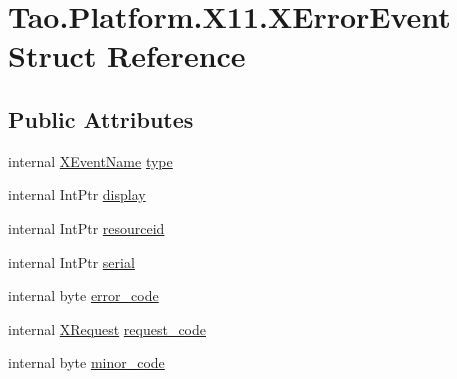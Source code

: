 \hypertarget{struct_tao_1_1_platform_1_1_x11_1_1_x_error_event}{
\section{Tao.Platform.X11.XErrorEvent Struct Reference}
\label{struct_tao_1_1_platform_1_1_x11_1_1_x_error_event}
}
\subsection*{Public Attributes}
\begin{DoxyCompactItemize}
\item 
internal \hyperlink{namespace_tao_1_1_platform_1_1_x11_aff81ed5b8778e1ea8e872861dff9f146}{XEventName} \hyperlink{struct_tao_1_1_platform_1_1_x11_1_1_x_error_event_a5a939be28f2545b3b519ab16ecab0cda}{type}
\item 
internal IntPtr \hyperlink{struct_tao_1_1_platform_1_1_x11_1_1_x_error_event_a1c2349bff48f8ba7d97c21e4999bc946}{display}
\item 
internal IntPtr \hyperlink{struct_tao_1_1_platform_1_1_x11_1_1_x_error_event_ac7b0c4ba5b882d353d5ad0f9f2017207}{resourceid}
\item 
internal IntPtr \hyperlink{struct_tao_1_1_platform_1_1_x11_1_1_x_error_event_a2e56f1ab5dca13dda7c236bd4ea0bde5}{serial}
\item 
internal byte \hyperlink{struct_tao_1_1_platform_1_1_x11_1_1_x_error_event_ade74cd0527540ddcfdca4b2b4722f082}{error\_\-code}
\item 
internal \hyperlink{namespace_tao_1_1_platform_1_1_x11_a2cfd0ff14439adb84809be96fb4c7d4b}{XRequest} \hyperlink{struct_tao_1_1_platform_1_1_x11_1_1_x_error_event_ac14a145f2eab548be2fceafa5f6c25ff}{request\_\-code}
\item 
internal byte \hyperlink{struct_tao_1_1_platform_1_1_x11_1_1_x_error_event_a5f21b4348fdc2d8932fe90945b66d409}{minor\_\-code}
\end{DoxyCompactItemize}


